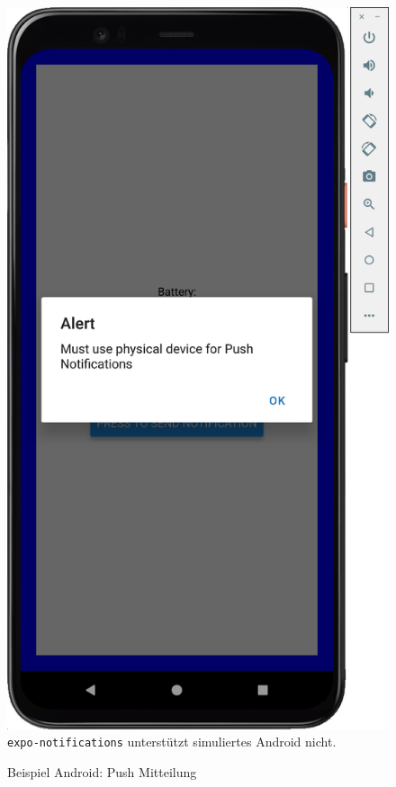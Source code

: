 \documentclass[a4paper]{scrartcl}
\begin{document}
\begin{figure}[H]
	\centering
	\caption{Beispiel Android: Push Mitteilung}
	\includegraphics[scale=0.25]{_assets/Android_push_notification.png} \\
	\texttt{expo-notifications} unterstützt simuliertes Android nicht. 
\end{figure}
\end{document}
